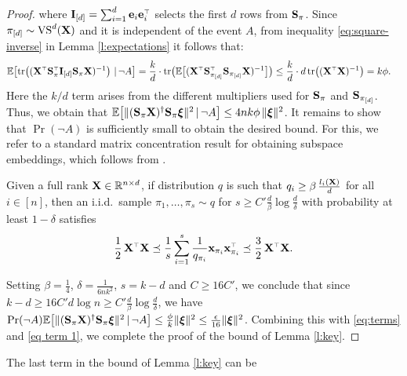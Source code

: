 \documentclass[12pt]{sty/colt2019/colt2018-arxiv}
\begin{document}
\begin{proof}
 where $\I_{[d]}=\sum_{i=1}^d\e_i\e_i^\top$ selects the
 first $d$ rows from $\S_\pi$.
 Since $\pi_{[d]}\sim \Vol^d(\X)$ and it is independent of the event
 $A$, from inequality \eqref{eq:square-inverse} in Lemma \ref{l:expectations} it
 follows that:
 \begin{align*}
   \E\big[\tr\big((\X^\top\S_{\pi}^\top\I_{[d]}\S_{\pi}\X)^{-1}\big)\
   |\,\neg A\big]
   &=   \frac{k}{d}\cdot\tr\big(
     \E\big[(\X^\top\S_{\pi_{[d]}}^\top\S_{\pi_{[d]}}\X)^{-1}\big]\big)
\leq \frac kd\cdot d\,\tr\big((\X^\top\X)^{-1}\big) = k\phi.
 \end{align*}
 Here the $k/d$ term arises from the different multipliers used for $\S_\pi$ and
 $\S_{\pi_{[d]}}$.
 Thus, we obtain that $\E\big[\|(\S_\pi\X)^\dagger\S_\pi\xib\|^2\,|\,\neg A\big]\leq
 4nk\phi\, \|\xib\|^2$. It remains to show that $\Pr(\neg A)$ is sufficiently
 small to obtain the desired bound. For this, we refer to a standard
matrix concentration result for obtaining subspace embeddings, which
follows from \cite{matrix-tail-bounds}.
\begin{lemma}
Given a full rank $\X\in\R^{n\times d}$, if distribution $q$ is such that
$q_i\geq \beta\,\frac{l_i(\X)}{d}$ for all $i\in[n]$, then an i.i.d.~sample
$\pi_1,\dots,\pi_s\sim q$ for $s\geq C'\frac d\beta\log
\frac d\delta$ with probability at least $1-\delta$ satisfies
\begin{align*}
\frac12\,\X^\top\X\preceq
  \frac1s\sum_{i=1}^s\frac1{q_{\pi_i}}\x_{\pi_i}\x_{\pi_i}^\top\preceq
  \frac32\,\X^\top\X. 
\end{align*}
\end{lemma}
Setting $\beta=\frac14$, $\delta = \frac1{6nk^2}$, $s=k-d$ and $C\geq
16C'$, we conclude that
since $k-d\geq 16C' d\log n\geq C'\frac d\beta\log \frac d\delta$, we have $\Pr(\neg A)
\E\big[\|(\S_\pi\X)^\dagger\S_\pi\xib\|^2\,|\,\neg A\big] \leq \frac \phi k \|\xib\|^2 \leq \frac\epsilon
{16} \|\xib\|^2$. Combining this with \eqref{eq:terms} and \eqref{eq term 1}, 
we complete the proof of the bound of Lemma \ref{l:key}.
\end{proof}
The last term in the bound of Lemma \ref{l:key} can be
\end{document}
